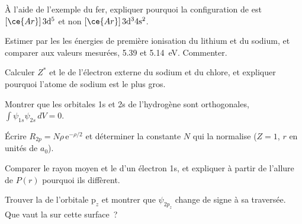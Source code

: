 \begin{exercise}[$\star\star$]\label{exo:b2:atomic-orbitals:6}
À l'aide de l'exemple du fer, expliquer pourquoi la configuration de  est
$[\ce{Ar}]\,3\mathrm d^5$ et non $[\ce{Ar}]\,3\mathrm d^3 4\mathrm s^2$.
\end{exercise}

\begin{exercise}[$\star\star$]\label{exo:b2:atomic-orbitals:7}
Estimer par les  les énergies de première ionisation du lithium et du sodium,
et comparer aux valeurs mesurées, 5.39 et \qty{5.14}{eV}. Commenter.
\end{exercise}

\begin{exercise}[$\star\star$]\label{exo:b2:atomic-orbitals:8}
Calculer $Z^*$ et le  de l'électron externe du sodium et du
chlore, et expliquer pourquoi l'atome de sodium est le plus gros.
\end{exercise}

\begin{exercise}[$\star\star$]\label{exo:b2:atomic-orbitals:9}
Montrer que les orbitales 1s et 2s de l'hydrogène sont orthogonales,
$\int\psi_{1s}\psi_{2s}\,dV = 0$.
\end{exercise}

\begin{exercise}[$\star\star\star$]\label{exo:b2:atomic-orbitals:10}
Écrire $R_{2p} = N\rho\,\mathrm e^{-\rho/2}$ et déterminer la constante $N$ qui la normalise
($Z = 1$, $r$ en unités de $a_0$).
\end{exercise}

\begin{exercise}[$\star\star\star$]\label{exo:b2:atomic-orbitals:11}
Comparer le rayon moyen et le  d'un électron 1s, et
expliquer à partir de l'allure de $P(r)$ pourquoi ils diffèrent.
\end{exercise}

\begin{exercise}[$\star\star\star$]\label{exo:b2:atomic-orbitals:12}
Trouver la  de l'orbitale $\mathrm p_z$ et montrer que $\psi_{2p_z}$
change de signe à sa traversée. Que vaut la  sur cette surface~?
\end{exercise}

